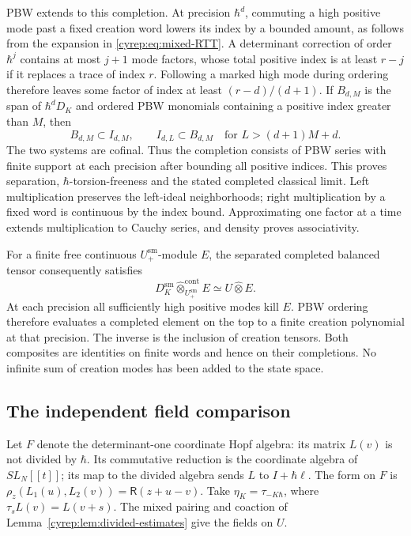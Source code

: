 PBW extends to this completion. At precision \(\hbar^d\),
commuting a high positive mode past a fixed creation word lowers
its index by a bounded amount, as follows from the expansion in
\eqref{cyrep:eq:mixed-RTT}.
A determinant correction of order \(\hbar^j\) contains at most
\(j+1\) mode factors, whose total positive index is at least \(r-j\)
if it replaces a trace of index \(r\).
Following a marked high mode during ordering therefore leaves
some factor of index at least \((r-d)/(d+1)\).
If \(B_{d,M}\) is the span of \(\hbar^dD_K\) and ordered PBW
monomials containing a positive index greater than \(M\), then
\[
 B_{d,M}\subset I_{d,M},\qquad
 I_{d,L}\subset B_{d,M}\quad\text{for }L>(d+1)M+d.
\]
The two systems are cofinal.
Thus the completion consists of PBW series with finite support
at each precision after bounding all positive indices.
This proves separation, \(\hbar\)-torsion-freeness and the
stated completed classical limit.
Left multiplication preserves the left-ideal neighborhoods;
right multiplication by a fixed word is continuous by the index
bound. Approximating one factor at a time extends multiplication
to Cauchy series, and density proves associativity.

For a finite free continuous \(U_+^{\mathrm{sm}}\)-module \(E\),
the separated completed balanced tensor consequently satisfies
\[
 D_K^{\mathrm{sm}}\widehat\otimes^{\mathrm{cont}}_{U_+^{\mathrm{sm}}}E
                       \simeq U\widehat\otimes E.
\]
At each precision all sufficiently high positive modes kill \(E\).
PBW ordering therefore evaluates a completed element on the top
to a finite creation polynomial at that precision.
The inverse is the inclusion of creation tensors.
Both composites are identities on finite words and hence on
their completions. No infinite sum of creation modes has been
added to the state space.

\subsection{The independent field comparison}

Let \(F\) denote the determinant-one coordinate Hopf algebra:
its matrix \(L(v)\) is not divided by \(\hbar\).
Its commutative reduction is the coordinate algebra of
\(SL_N[[t]]\); its map to the divided algebra sends
\(L\) to \(I+\hbar\ell\).
The form on \(F\) is
\(\rho_z(L_1(u),L_2(v))=\mathsf R(z+u-v)\).
Take \(\eta_K=\tau_{-K\hbar}\), where
\(\tau_sL(v)=L(v+s)\).
The mixed pairing and coaction of
Lemma~\ref{cyrep:lem:divided-estimates} give the fields on \(U\).

